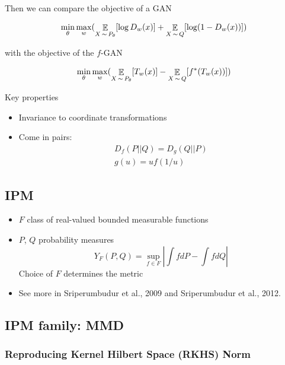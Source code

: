 \documentclass[b5paper]{report}
\begin{document}
Then we can compare the objective of a GAN

\begin{equation}
  \min_\theta \max_w ( \operatorname*{\mathbb{\mathop{E}}}_{X\operatorname*{\sim} P_\theta}[\log D_w(x)] + \operatorname*{\mathbb{\mathop{E}}}_{X\operatorname*{\sim}
  Q}[\log (1-D_w(x))])
\end{equation}

with the objective of the $f$-GAN

\begin{equation}
  \min_\theta \max_w ( \operatorname*{\mathbb{\mathop{E}}}_{X\operatorname*{\sim} P_\theta}[T_w(x)] - \operatorname*{\mathbb{\mathop{E}}}_{X\operatorname*{\sim}
  Q}[f^*(T_w(x))])
\end{equation}

Key properties

\begin{itemize}
  \item Invariance to coordinate transformations
  \item Come in pairs:
    \begin{align}
      D_f(P||Q) = D_g(Q||P) \\
      g(u) = uf(1/u)
    \end{align}
\end{itemize}

\subsection{IPM}

\begin{itemize}
  \item $F$ class of real-valued bounded measurable functions
  \item $P$, $Q$ probability measures
    \begin{equation}
      Y_F(P,Q) = \sup_{f \in F} \left| \int fdP - \int fdQ \right|
    \end{equation}
  Choice of $F$ determines the metric
\item See more in Sriperumbudur et al., 2009 and Sriperumbudur et al., 2012.
\end{itemize}

\subsection{IPM family: MMD}


\subsubsection{Reproducing Kernel Hilbert Space (RKHS) Norm}
\end{document}
